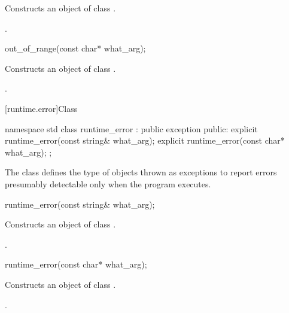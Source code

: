 \begin{itemdescr}
\pnum
\effects
Constructs an object of class
.

\pnum
\postcondition
{}.
\end{itemdescr}

%
\begin{itemdecl}
out_of_range(const char* what_arg);
\end{itemdecl}

\begin{itemdescr}
\pnum
\effects
Constructs an object of class
.

\pnum
\postcondition
{}.
\end{itemdescr}

[runtime.error]{Class }

%
\begin{codeblock}
namespace std {
  class runtime_error : public exception {
  public:
    explicit runtime_error(const string& what_arg);
    explicit runtime_error(const char* what_arg);
  };
}
\end{codeblock}

\pnum
The class
defines the type of objects thrown as exceptions to report errors presumably detectable only
when the program executes.

%
\begin{itemdecl}
runtime_error(const string& what_arg);
\end{itemdecl}

\begin{itemdescr}
\pnum
\effects
Constructs an object of class
.

\pnum
\postcondition
{}.
\end{itemdescr}

%
\begin{itemdecl}
runtime_error(const char* what_arg);
\end{itemdecl}

\begin{itemdescr}
\pnum
\effects
Constructs an object of class
.

\pnum
\postcondition
{}.
\end{itemdescr}

